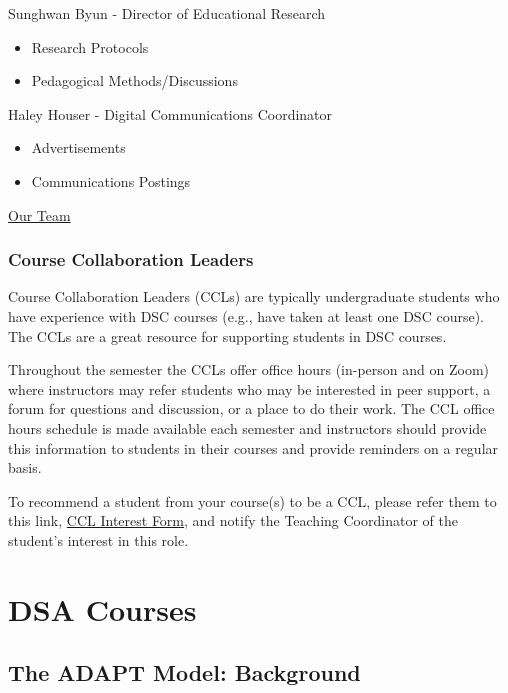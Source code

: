 \documentclass[
]{book}
\providecommand{\tightlist}{%
  \setlength{\itemsep}{0pt}\setlength{\parskip}{0pt}}
\begin{document}
Sunghwan Byun - Director of Educational Research

\begin{itemize}
\tightlist
\item
  Research Protocols
\item
  Pedagogical Methods/Discussions
\end{itemize}

Haley Houser - Digital Communications Coordinator

\begin{itemize}
\tightlist
\item
  Advertisements
\item
  Communications Postings
\end{itemize}

\href{https://datascienceacademy.ncsu.edu/about/our-team/}{Our Team}

\hypertarget{course-collaboration-leaders}{%
\subsection{Course Collaboration Leaders}\label{course-collaboration-leaders}}

Course Collaboration Leaders (CCLs) are typically undergraduate students who have experience with DSC courses (e.g., have taken at least one DSC course). The CCLs are a great resource for supporting students in DSC courses.

Throughout the semester the CCLs offer office hours (in-person and on Zoom) where instructors may refer students who may be interested in peer support, a forum for questions and discussion, or a place to do their work. The CCL office hours schedule is made available each semester and instructors should provide this information to students in their courses and provide reminders on a regular basis.

To recommend a student from your course(s) to be a CCL, please refer them to this link, \href{https://docs.google.com/forms/d/e/1FAIpQLSfl-K8qOfUTh77ahkh_RsTb-dJI8GhbmR0_bUkp7SuJ_tCJTA/viewform}{CCL Interest Form}, and notify the Teaching Coordinator of the student's interest in this role.

\hypertarget{dsa-courses}{%
\chapter{DSA Courses}\label{dsa-courses}}

\hypertarget{the-adapt-model-background}{%
\section{The ADAPT Model: Background}\label{the-adapt-model-background}}
\end{document}
